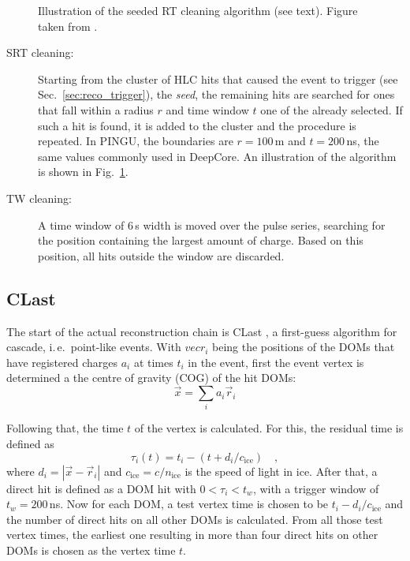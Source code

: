 \begin{figure}
\centering
  \caption{Illustration of the seeded RT cleaning algorithm (see text). Figure
    taken from \cite{SRT}.}
\label{fig:SRTcleaning}
\end{figure}

\begin{description}
 \item[SRT cleaning:] Starting from the cluster of HLC hits that caused the
  event to trigger (see Sec.~\ref{sec:reco_trigger}), the \emph{seed}, the
  remaining hits are searched for ones that fall within a radius $r$ and time
  window $t$ \wrt one of the already selected. If such a hit is found, it is
  added to the cluster and the procedure is repeated. In PINGU, the boundaries
  are $r=100$\,m and $t=200$\,ns, the same values commonly used in DeepCore.
  An illustration of the algorithm is shown in Fig.~\ref{fig:SRTcleaning}.
 \item[TW cleaning:] A time window of 6\,\textmu s width is moved over the pulse
  series, searching for the position containing the largest amount of charge.
  Based on this position, all hits outside the window are discarded.
\end{description}


\subsection{CLast}
\label{sec:reco_clast}

The start of the actual reconstruction chain is CLast \cite{CLast}, a
first-guess algorithm for cascade, i.\,e.\ point-like events. With $vec{r}_i$
being the positions of the DOMs that have registered charges $a_i$ at times
$t_i$ in the event, first the event vertex is determined a the centre of gravity
(COG) of the hit DOMs:
\begin{equation}
 \vec{x} = \sum_i a_i \vec{r}_i
\end{equation}

Following that, the time $t$ of the vertex is calculated. For this, the residual
time is defined as
\begin{equation}
 \tau_i(t) = t_i - \left( t + d_i/c_\mathrm{ice} \right) \quad,
\end{equation}
where $d_i = | \vec{x} - \vec{r}_i |$ and $c_\mathrm{ice} = c/n_\mathrm{ice}$ is
the speed of light in ice. After that, a direct hit is defined as a DOM hit
with $0 < \tau_i < t_w$, with a trigger window of $t_w = 200$\,ns. Now for each
DOM, a test vertex time is chosen to be $t_i - d_i/c_\mathrm{ice}$ and the
number of direct hits on all other DOMs is calculated. From all those test
vertex times, the earliest one resulting in more than four direct hits on other
DOMs is chosen as the vertex time $t$.

